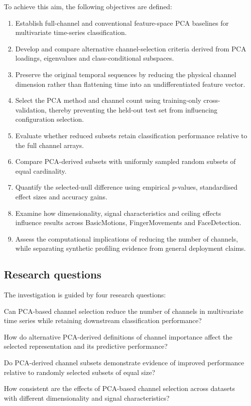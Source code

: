 To achieve this aim, the following objectives are defined:

\begin{enumerate}[leftmargin=*]
    \item Establish full-channel and conventional feature-space PCA baselines for multivariate time-series classification.
    \item Develop and compare alternative channel-selection criteria derived from PCA loadings, eigenvalues and class-conditional subspaces.
    \item Preserve the original temporal sequences by reducing the physical channel dimension rather than flattening time into an undifferentiated feature vector.
    \item Select the PCA method and channel count using training-only cross-validation, thereby preventing the held-out test set from influencing configuration selection.
    \item Evaluate whether reduced subsets retain classification performance relative to the full channel arrays.
    \item Compare PCA-derived subsets with uniformly sampled random subsets of equal cardinality.
    \item Quantify the selected-null difference using empirical $p$-values, standardised effect sizes and accuracy gains.
    \item Examine how dimensionality, signal characteristics and ceiling effects influence results across BasicMotions, FingerMovements and FaceDetection.
    \item Assess the computational implications of reducing the number of channels, while separating synthetic profiling evidence from general deployment claims.
\end{enumerate}

\subsection{Research questions}

The investigation is guided by four research questions:

\begin{description}[leftmargin=13mm,style=nextline]
    \item[RQ1] Can PCA-based channel selection reduce the number of channels in multivariate time series while retaining downstream classification performance?
    \item[RQ2] How do alternative PCA-derived definitions of channel importance affect the selected representation and its predictive performance?
    \item[RQ3] Do PCA-derived channel subsets demonstrate evidence of improved performance relative to randomly selected subsets of equal size?
    \item[RQ4] How consistent are the effects of PCA-based channel selection across datasets with different dimensionality and signal characteristics?
\end{description}

